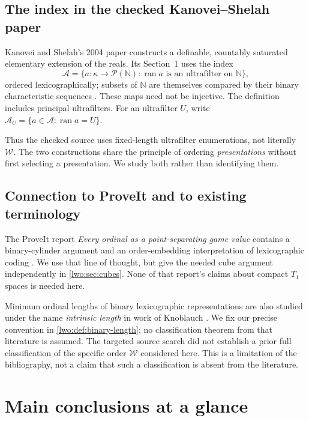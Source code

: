 \documentclass[11pt,a4paper]{article}
\theoremstyle{definition}
\theoremstyle{remark}
\newcommand{\N}{\mathbb N}
\newcommand{\W}{\mathcal W}
\newcommand{\A}{\mathcal A}
\newcommand{\ran}{\operatorname{ran}}
\begin{document}
\subsection{The index in the checked Kanovei--Shelah paper}
Kanovei and Shelah's 2004 paper constructs a definable, countably saturated
elementary extension of the reals. Its Section~1 uses the index
\begin{equation}\label{lwo:eq:KS}
 \A=\{a:\kappa\longrightarrow\mathcal P(\N):
                     \ran a\text{ is an ultrafilter on }\N\},
\end{equation}
ordered lexicographically; subsets of $\N$ are themselves compared by their
binary characteristic sequences \cite[Section~1]{KS}. These maps need not be
injective. The definition includes principal ultrafilters. For an ultrafilter
$U$, write $\A_U=\{a\in\A:\ran a=U\}$.

Thus the checked source uses fixed-length ultrafilter enumerations, not
literally $\W$. The two constructions share the principle of ordering
\emph{presentations} without first selecting a presentation. We study both
rather than identifying them.

\subsection{Connection to ProveIt and to existing terminology}
The ProveIt report \emph{Every ordinal as a point-separating game value}
contains a binary-cylinder argument and an order-embedding interpretation of
lexicographic coding \cite{ProveIt}. We use that line of thought, but give the
needed cube argument independently in \cref{lwo:sec:cubes}. None of that report's
claims about compact $T_1$ spaces is needed here.

Minimum ordinal lengths of binary lexicographic representations are also
studied under the name \emph{intrinsic length} in work of Knoblauch
\cite{Knoblauch}. We fix our precise convention in \cref{lwo:def:binary-length};
no classification theorem from that literature is assumed. The targeted source
search did not establish a prior full classification of the specific order
$\W$ considered here. This is a limitation of the bibliography, not a claim
that such a classification is absent from the literature.

\section{Main conclusions at a glance}\label{lwo:sec:summary}
\end{document}
